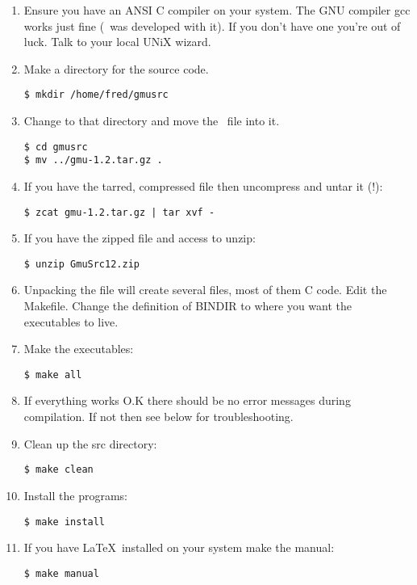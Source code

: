\documentclass[11pt,twoside]{article}
\begin{document}
\begin{enumerate}
\item Ensure you have an ANSI C compiler on your system.  The GNU  compiler
gcc works just fine (\gmu\ was developed with it). If you don't have one 
you're out of luck. Talk to your local UNiX wizard.

\item Make a directory for the source code.
\begin{verbatim}
$ mkdir /home/fred/gmusrc
\end{verbatim}

\item Change to that directory and move the \gmutar\ file into it.
\begin{verbatim}
$ cd gmusrc
$ mv ../gmu-1.2.tar.gz .
\end{verbatim}

\item If you have the tarred, compressed file then uncompress and untar it (!):
\begin{verbatim}
$ zcat gmu-1.2.tar.gz | tar xvf -
\end{verbatim}

\item If you have the zipped file and access to unzip:
\begin{verbatim}
$ unzip GmuSrc12.zip
\end{verbatim}

\item Unpacking the file will create  several files, most of them C code.
Edit the Makefile. Change the definition of BINDIR to where you want the
executables to live.

\item Make the executables:
\begin{verbatim}
$ make all
\end{verbatim}

\item If everything  works O.K  there  should  be no  error messages during
compilation. If not then see below for troubleshooting.

\item Clean up the src directory:
\begin{verbatim}
$ make clean
\end{verbatim}

\item Install the programs:
\begin{verbatim}
$ make install
\end{verbatim}

\item If you have \LaTeX\ installed on your system make the manual:
\begin{verbatim}
$ make manual
\end{verbatim}
\end{enumerate}
\end{document}
